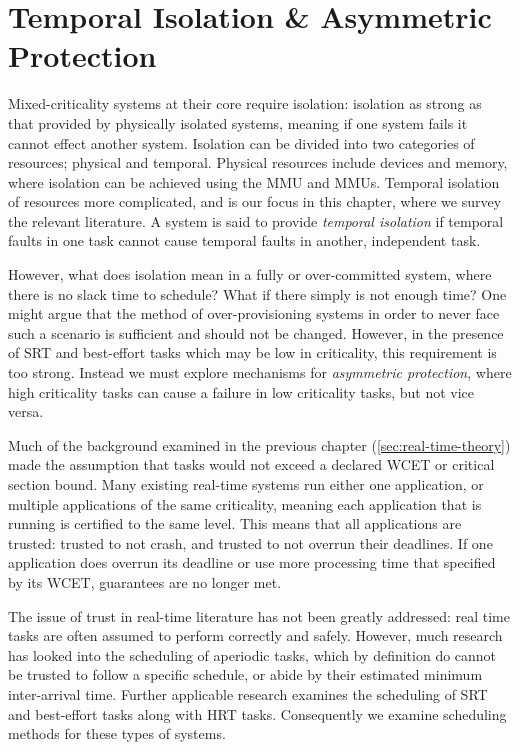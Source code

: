 \chapter{Temporal Isolation \& Asymmetric Protection}
\label{chap:scheduling}

Mixed-criticality systems at their core require isolation: isolation as strong as that provided by
physically isolated systems, meaning if one system fails it cannot effect another system.  Isolation
can be divided into two categories of resources; physical and temporal. Physical resources include 
devices and memory, where isolation can be achieved using the \gls{MMU} and \IO\glspl{MMU}.
Temporal isolation of resources more complicated, and is our focus in this chapter, where
we survey the relevant literature.
A system is said to provide \emph{temporal isolation} if temporal faults in one task cannot cause
temporal faults in another, independent task. 

However, what does isolation mean in a fully or over-committed system, where there is no slack time 
to schedule? What if there simply is not enough time? One might argue that the method of
over-provisioning systems in order to never face such a scenario is sufficient and should not be
changed. However, in the presence of \gls{SRT} and best-effort tasks which may be low in
criticality, this requirement is too strong. Instead we must explore mechanisms for \emph{asymmetric
protection}, where high criticality tasks can cause a failure in low criticality tasks, but not vice
versa.

Much of the background examined in the previous chapter (\cref{sec:real-time-theory})
made the assumption that tasks would not exceed a declared \gls{WCET} or critical section bound. 
Many existing real-time systems run either one application, or multiple applications of the same
criticality, meaning each application that is running is certified to the same level.  This means
that all applications are trusted: trusted to not crash, and trusted to not overrun their deadlines.
If one application does overrun its deadline or use more processing time that specified by its
\gls{WCET}, guarantees are no longer met. 

The issue of trust in real-time literature has not been greatly addressed: real time tasks are often
assumed to perform correctly and safely.  However, much research has looked into the scheduling of
aperiodic tasks, which by definition do cannot be trusted to follow a specific schedule, or abide by
their estimated minimum inter-arrival time. Further applicable research examines the scheduling of
\gls{SRT} and best-effort tasks along with \gls{HRT} tasks. Consequently we examine scheduling methods for
these types of systems. 

